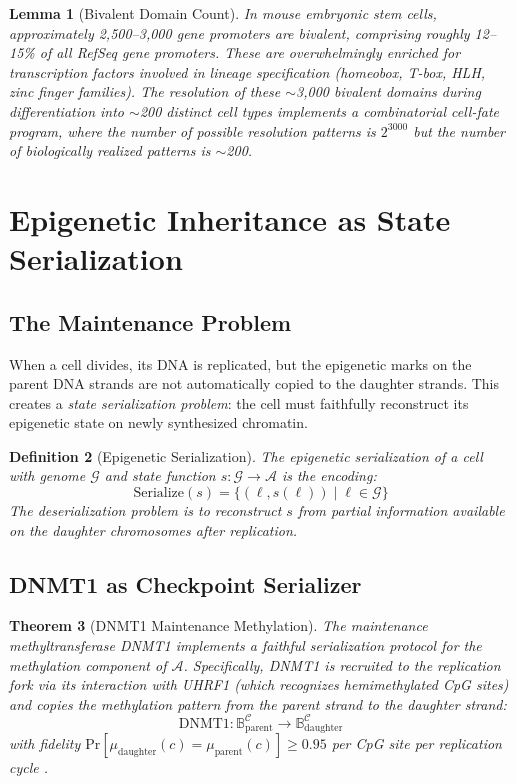 \documentclass[12pt,a4paper]{article}
\newtheorem{theorem}{Theorem}[section]
\newtheorem{lemma}[theorem]{Lemma}
\newtheorem{definition}[theorem]{Definition}
\begin{document}
\begin{lemma}[Bivalent Domain Count]
\label{lem:biv-count}
In mouse embryonic stem cells, approximately 2,500--3,000 gene promoters are bivalent, comprising roughly 12--15\% of all RefSeq gene promoters. These are overwhelmingly enriched for transcription factors involved in lineage specification (homeobox, T-box, HLH, zinc finger families). The resolution of these $\sim$3,000 bivalent domains during differentiation into $\sim$200 distinct cell types implements a combinatorial cell-fate program, where the number of possible resolution patterns is $2^{3000}$ but the number of biologically realized patterns is $\sim$200.
\end{lemma}

\section{Epigenetic Inheritance as State Serialization}
\label{sec:inheritance}

\subsection{The Maintenance Problem}

When a cell divides, its DNA is replicated, but the epigenetic marks on the parent DNA strands are not automatically copied to the daughter strands. This creates a \emph{state serialization problem}: the cell must faithfully reconstruct its epigenetic state on newly synthesized chromatin.

\begin{definition}[Epigenetic Serialization]
\label{def:serialization}
The \emph{epigenetic serialization} of a cell with genome $\mathcal{G}$ and state function $s : \mathcal{G} \to \mathcal{A}$ is the encoding:
\[
    \mathrm{Serialize}(s) = \{(\ell, s(\ell)) \mid \ell \in \mathcal{G}\}
\]
The \emph{deserialization} problem is to reconstruct $s$ from partial information available on the daughter chromosomes after replication.
\end{definition}

\subsection{DNMT1 as Checkpoint Serializer}

\begin{theorem}[DNMT1 Maintenance Methylation]
\label{thm:dnmt1}
The maintenance methyltransferase DNMT1 implements a faithful serialization protocol for the methylation component of $\mathcal{A}$. Specifically, DNMT1 is recruited to the replication fork via its interaction with UHRF1 (which recognizes hemimethylated CpG sites) and copies the methylation pattern from the parent strand to the daughter strand:
\[
    \mathrm{DNMT1} : \mathbb{B}^{\mathcal{C}}_{\mathrm{parent}} \to \mathbb{B}^{\mathcal{C}}_{\mathrm{daughter}}
\]
with fidelity $\mathrm{Pr}[\mu_{\mathrm{daughter}}(c) = \mu_{\mathrm{parent}}(c)] \geq 0.95$ per CpG site per replication cycle \cite{smith2013}.
\end{theorem}
\end{document}
